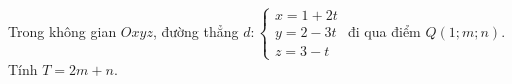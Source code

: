 \begin{ex}
Trong không gian $Oxyz$, đường thẳng $d\colon\begin{cases}x=1+2t\\y=2-3t\\z=3-t\end{cases}$ đi qua điểm $Q(1;m;n)$. Tính $T=2m+n$.
\end{ex}
